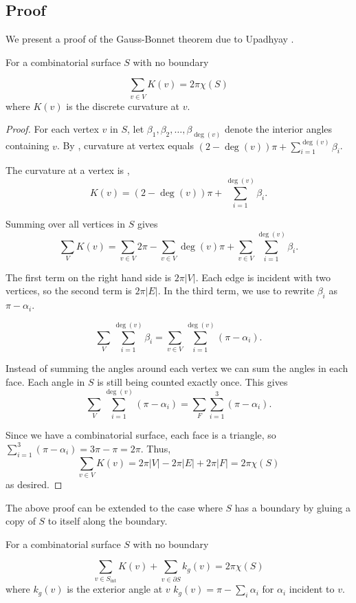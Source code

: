 \subsection{Proof}
\label{sec:proof}


We present a proof of the Gauss-Bonnet theorem due to Upadhyay \cite{upadhyay2015}.



\begin{theorem}\label{thm:g-b-discete-bdy}
For a combinatorial surface $S$ with no boundary

$$\sum_{v\in V} K(v)=2\pi \chi(S)$$
where $K(v)$ is the discrete curvature at $v$.
\end{theorem}

\begin{proof}

For each vertex $v$ in $S$,
let $\beta_1,\beta_2,\ldots,\beta_{\deg{(v)}}$ denote the interior angles
containing $v$.
By , curvature at vertex equals $(2-\deg{(v)})\pi +\sum_{i=1}^{\deg{(v)}} \beta_i$.

The curvature at a vertex is ,
 $$K(v)=(2-\deg{(v)})\pi +\sum_{i=1}^{\deg{(v)}} \beta_i.$$

Summing over all vertices in $S$ gives
$$\sum_{V} K(v)=\sum_{v\in V}2\pi - \sum_{v\in V}\deg{(v)}\pi+\sum_{v\in V}\sum_{i=1}^{\deg{(v)}} \beta_i.$$

The first term on the right hand side is $2\pi |V|$. Each edge is incident with two vertices, so the second term is $2\pi |E|$. 
In the third term, we use  to rewrite $\beta_i$ as $\pi-\alpha_i$.

$$ \sum_{V}\sum_{i=1}^{\deg{(v)}} \beta_i= \sum_{v\in V}\sum_{i=1}^{\deg{(v)}} (\pi-\alpha_i).$$

Instead of summing the angles around each vertex we can sum the angles in each face.
Each angle in $S$ is still being counted exactly once. This gives
$$\sum_{V}\sum_{i=1}^{\deg{(v)}} (\pi-\alpha_i)=\sum_F\sum_{i=1}^3(\pi-\alpha_i).$$

Since we have a combinatorial surface, each face is a triangle,
so $\sum_{i=1}^3(\pi-\alpha_i)=3\pi-\pi=2\pi.$
Thus, $$\sum_{v\in V} K(v)=2\pi |V|-2\pi |E|+2\pi |F|=2\pi \chi(S)$$ as desired.
\end{proof}

The above proof can be extended to the case where $S$ has a boundary
by gluing a copy of $S$ to itself along the boundary.

\begin{theorem}\label{thm:g-b-discete}
For a combinatorial surface $S$ with no boundary

$$\sum_{v\in S_{\text{int}}} K(v)+\sum_{v\in\partial S}k_g(v)=2\pi \chi(S)$$
where $k_g(v)$ is the exterior angle at $v$ 
$k_g(v)=\pi-\sum_i\alpha_i$ for $\alpha_i$ incident to $v$.
\end{theorem}

